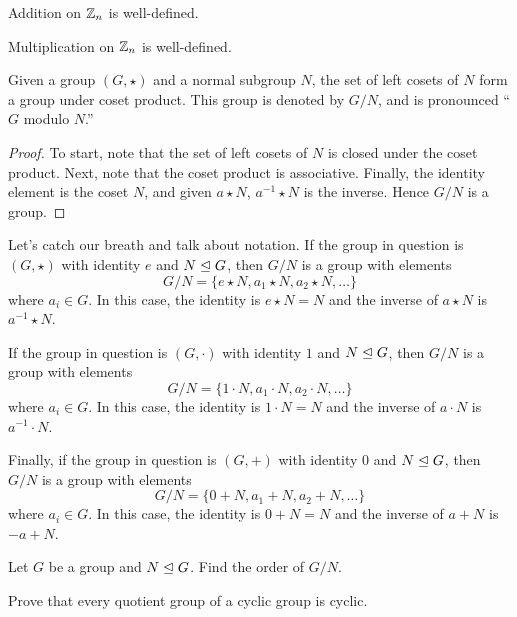 \documentclass{ximera}
\begin{document}
\begin{corollary}
  Addition on $\mathbb Z_n$ is well-defined.
\end{corollary}


\begin{corollary}
  Multiplication on $\mathbb Z_n$ is well-defined.
\end{corollary}


\begin{theorem}\label{T:quotient}
  Given a group $(G,\star)$ and a normal subgroup $N$, the set of left
  cosets of $N$ form a group under coset product. This group is
  denoted by $G/N$, and is pronounced ``$G$ modulo $N$.''
  \begin{proof}
    To start, note that the set of left cosets of $N$ is closed under
    the coset product. Next, note that the coset product is
    associative. Finally, the identity element is the coset $N$, and
    given $a\star N$, $a^{-1}\star N$ is the inverse. Hence $G/N$ is a
    group.
  \end{proof}
\end{theorem}

Let's catch our breath and talk about notation. If the group in
question is $(G,\star)$ with identity $e$ and $N\trianglelefteq G$, then $G/N$
is a group with elements
\[
G/N=\{e\star N, a_1\star N, a_2 \star N, \dots\}
\]
where $a_i\in G$. In this case, the identity is $e\star N = N$ and the
inverse of $a\star N$ is $a^{-1}\star N$.



If the group in question is $(G,\cdot)$ with identity $1$ and
$N\trianglelefteq G$, then $G/N$ is a group with elements
\[
G/N=\{1\cdot N, a_1\cdot N, a_2 \cdot N, \dots\}
\]
where $a_i\in G$. In this case, the identity is $1\cdot N = N$ and the
inverse of $a\cdot N$ is $a^{-1}\cdot N$.


Finally, if the group in question is $(G,+)$ with identity $0$ and
$N\trianglelefteq G$, then $G/N$ is a group with elements
\[
G/N=\{0+N, a_1+ N, a_2 + N, \dots\}
\]
where $a_i\in G$. In this case, the identity is $0+ N = N$ and the
inverse of $a+ N$ is $-a +  N$.






\begin{exercise}
  Let $G$ be a group and $N\trianglelefteq G$. Find the order of $G/N$.
\end{exercise}


\begin{exercise}
  Prove that every quotient group of a cyclic group is cyclic.
\end{exercise}
\end{document}
